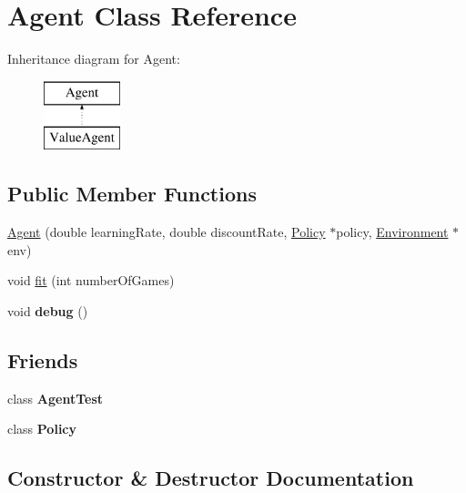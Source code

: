 \hypertarget{class_agent}{}\section{Agent Class Reference}
\label{class_agent}
Inheritance diagram for Agent\+:\begin{figure}[H]
\begin{center}
\leavevmode
\includegraphics[height=2.000000cm]{class_agent}
\end{center}
\end{figure}
\subsection*{Public Member Functions}
\begin{DoxyCompactItemize}
\item 
\mbox{\hyperlink{class_agent_af202a4bd6845d8d2730e492f455785e3}{Agent}} (double learning\+Rate, double discount\+Rate, \mbox{\hyperlink{class_policy}{Policy}} $\ast$policy, \mbox{\hyperlink{class_environment}{Environment}} $\ast$env)
\item 
void \mbox{\hyperlink{class_agent_aa5716d6513268b2b5714a46341fb9006}{fit}} (int number\+Of\+Games)
\item 
\mbox{\label{class_agent_a882df575e73539a3067087437a151b94}} 
void {\bfseries debug} ()
\end{DoxyCompactItemize}
\subsection*{Friends}
\begin{DoxyCompactItemize}
\item 
\mbox{\label{class_agent_ada6eaf56009c10f181cfc7b8e9957846}} 
class {\bfseries Agent\+Test}
\item 
\mbox{\label{class_agent_a7c64b6746f2b0b83e6ef1bbdfdd72245}} 
class {\bfseries Policy}
\end{DoxyCompactItemize}


\subsection{Constructor \& Destructor Documentation}
\mbox{\label{class_agent_af202a4bd6845d8d2730e492f455785e3}} 
